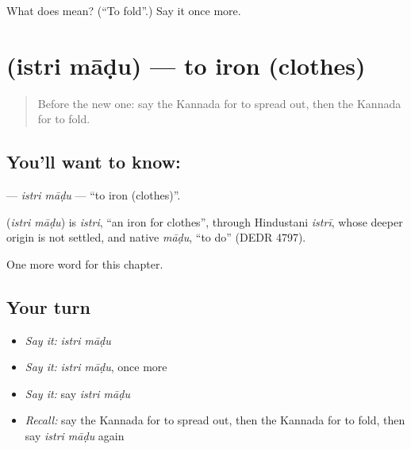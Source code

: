 \begin{tcolorbox}[breakable,colback=teal!4,colframe=teal!35!black,title={Before you move on}]
What does  mean? (\textquotedblleft{}To fold\textquotedblright{}.) Say it once more.
\end{tcolorbox}
\section[\texorpdfstring{\kn{ಇಸ್ತ್ರಿ} \kn{ಮಾಡು} (istri māḍu)}{ಇಸ್ತ್ರಿ ಮಾಡು (istri māḍu)}]{  (istri māḍu) — to iron (clothes)}

\label{lesson:KA-C199-istri-madu}



\begin{quote}
Before the new one: say the Kannada for to spread out, then the Kannada for to fold.
\end{quote}

\subsection*{You'll want to know:  }
\textbf{ } — \emph{istri māḍu} — \textquotedblleft{}to iron (clothes)\textquotedblright{}.

\begin{cousinweb}
\textbf{ } (\emph{istri māḍu}) is \emph{istri}, \textquotedblleft{}an iron for clothes\textquotedblright{}, through Hindustani \emph{istrī}, whose deeper origin is not settled, and native \emph{māḍu}, \textquotedblleft{}to do\textquotedblright{} (DEDR 4797).
\end{cousinweb}

\begin{grammarlens}[title={What you've built}]
One more word for this chapter.
\end{grammarlens}

\subsection*{Your turn}
\begin{itemize}
\raggedright
  \item \emph{Say it:} \emph{istri māḍu}
  \item \emph{Say it:} \emph{istri māḍu}, once more
  \item \emph{Say it:} say \emph{istri māḍu}
  \item \emph{Recall:} say the Kannada for to spread out, then the Kannada for to fold, then say \emph{istri māḍu} again
\end{itemize}

